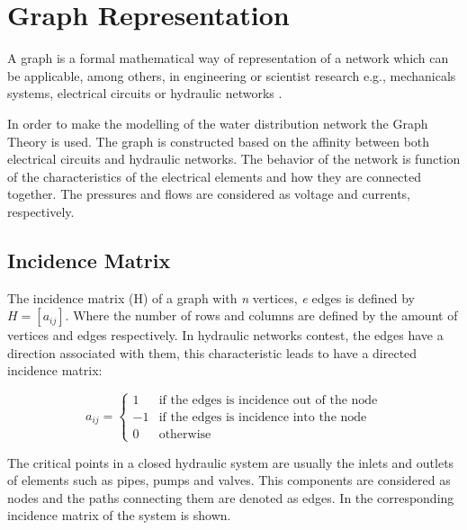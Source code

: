 \section{Graph Representation}  
\label{GraphTheory}
A graph is a formal mathematical way of representation of a network which can be applicable, among others, 
in engineering or scientist research e.g., mechanicals systems, electrical circuits or hydraulic networks \cite{graph_intro}. 

In order to make the modelling of the water distribution network the Graph Theory is used. The graph is constructed 
based on the affinity between both electrical circuits and hydraulic networks. 
The behavior of the network is function of the characteristics of the 
electrical elements and how they are connected together. The pressures and flows are considered as 
voltage and currents, respectively.

\subsection{Incidence Matrix} 

The incidence matrix (H) of a graph with \textit{n} vertices, \textit{e} edges is 
defined by $H = [a_{ij}]$. Where the number of rows and columns are defined by the amount of vertices and edges respectively.
In hydraulic networks contest, the edges have a direction associated with them, this characteristic leads to have a directed incidence matrix:

\begin{equation}
\label{DiGraph}
 a_{ij} =
		\left\{
		\begin{array}{ll}
		
		1 			&      \text{if the edges is incidence out of the node}	
\\
		-1                       &     \text{if the edges is incidence into the node}
\\

                0                       &      \text{otherwise}

		\end{array}
		\right.
\end{equation}	

The critical points in a closed hydraulic system are usually the inlets and outlets of elements such as pipes, pumps and valves. 
This components are considered as nodes and the paths connecting them are denoted as edges. 
In  the corresponding incidence matrix of the system is 
shown. 


